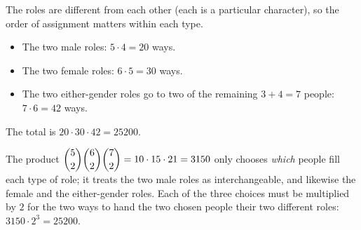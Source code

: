 The roles are different from each other (each is a particular character), so the order of assignment matters within each type.
\begin{itemize}
\item The two male roles: $5\cdot4=20$ ways.
\item The two female roles: $6\cdot5=30$ ways.
\item The two either-gender roles go to two of the remaining $3+4=7$ people: $7\cdot6=42$ ways.
\end{itemize}
The total is $20\cdot30\cdot42=\boxed{25200}$.

The product $\dbinom52\dbinom62\dbinom72=10\cdot15\cdot21=3150$ only chooses \emph{which} people fill each type of role; it treats the two male roles as interchangeable, and likewise the female and the either-gender roles. Each of the three choices must be multiplied by $2$ for the two ways to hand the two chosen people their two different roles: $3150\cdot2^3=25200$.
